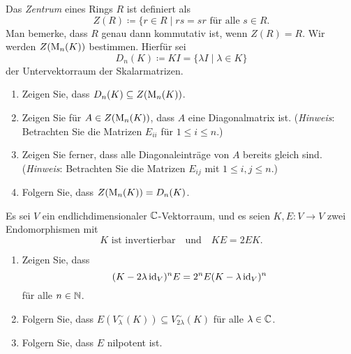 \documentclass[a4paper,10pt]{scrartcl}
\begin{document}



\begin{question}
  Das \emph{Zentrum} eines Rings $R$ ist definiert als
  \[
    Z(R) \coloneqq \{r \in R \mid \text{$rs = sr$ für alle $s \in R$}.
  \]
  Man bemerke, dass $R$ genau dann kommutativ ist, wenn $Z(R) = R$.
  Wir werden $Z(\operatorname{M}_n(K))$ bestimmen.
  Hierfür sei
  \[
    D_n(K) \coloneqq K I = \{\lambda I \mid \lambda \in K\}
  \]
  der Untervektorraum der Skalarmatrizen.
  \begin{enumerate}[leftmargin=*]
    \item
      Zeigen Sie, dass $D_n(K) \subseteq Z(\operatorname{M}_n(K))$.
    \item
      Zeigen Sie für $A \in Z(\operatorname{M}_n(K))$, dass $A$ eine Diagonalmatrix ist.
      (\emph{Hinweis}: Betrachten Sie die Matrizen $E_{ii}$ für $1 \leq i \leq n$.)
    \item
      Zeigen Sie ferner, dass alle Diagonaleinträge von $A$ bereits gleich sind.
      (\emph{Hinweis}: Betrachten Sie die Matrizen $E_{ij}$ mit $1 \leq i,j \leq n$.)
    \item
      Folgern Sie, dass $Z(\operatorname{M}_n(K)) = D_n(K)$.
  \end{enumerate}
\end{question}


\begin{question}
  Es sei $V$ ein endlichdimensionaler $\mathbb{C}$-Vektorraum, und es seien $K, E \colon V \to V$ zwei Endomorphismen mit
  \[
    \text{$K$ ist invertierbar}
    \quad\text{und}\quad
    KE = 2EK.
  \]
  \begin{enumerate}[leftmargin=*]
    \item
      Zeigen Sie, dass
      \[
        (K - 2 \lambda \operatorname{id}_V)^n E = 2^n E (K - \lambda \operatorname{id}_V)^n
      \]
      für alle $n \in \mathbb{N}$.
    \item
      Folgern Sie, dass $E( V^\sim_\lambda(K) ) \subseteq V^\sim_{2\lambda}(K)$ für alle $\lambda \in \mathbb{C}$.
    \item
      Folgern Sie, dass $E$ nilpotent ist.
  \end{enumerate}
\end{question}
\end{document}
